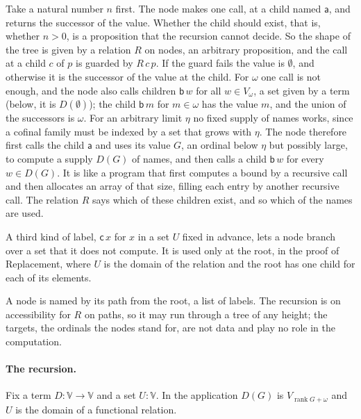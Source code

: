 \documentclass[10pt]{article}
\theoremstyle{definition}
\theoremstyle{remark}
\newcommand{\rk}{\operatorname{rank}}
\newcommand{\V}{\mathbb{V}}
\newcommand{\la}{\mathsf{a}}
\newcommand{\lb}{\mathsf{b}}
\newcommand{\lc}{\mathsf{c}}
\begin{document}
Take a natural number $n$ first. The node makes one call, at a child
named $\la$, and returns the successor of the value. Whether the child
should exist, that is, whether $n>0$, is a proposition that the
recursion cannot decide. So the shape of the tree is given by a relation
$R$ on nodes, an arbitrary proposition, and the call at a child $c$ of $p$
is guarded by $R\,c\,p$. If the guard fails the value is $\emptyset$, and
otherwise it is the successor of the value at the child. For $\omega$ one
call is not enough, and the node also calls children $\lb\,w$ for all
$w\in V_\omega$, a set given by a term (below, it is $D(\emptyset)$); the child $\lb\,m$ for $m\in\omega$ has the
value $m$, and the union of the successors is $\omega$. For an arbitrary
limit $\eta$ no fixed supply of names works, since a cofinal family must
be indexed by a set that grows with $\eta$. The node therefore first calls
the child $\la$ and uses its value $G$, an ordinal below $\eta$ but possibly
large, to compute a supply $D(G)$ of names, and then calls a child $\lb\,w$
for every $w\in D(G)$. It is like a program that first computes a bound
by a recursive call and then allocates an array of that size, filling
each entry by another recursive call. The relation $R$ says which of
these children exist, and so which of the names are used.

A third kind of label, $\lc\,x$ for $x$ in a set $U$ fixed in advance, lets
a node branch over a set that it does not compute. It is used only at
the root, in the proof of Replacement, where $U$ is the domain of the
relation and the root has one child for each of its elements.

A node is named by its path from the root, a list of labels. The
recursion is on accessibility for $R$ on paths, so it may run through a
tree of any height; the targets, the ordinals the nodes stand for, are
not data and play no role in the computation.

\paragraph{The recursion.}
Fix a term $D:\V\to\V$ and a set $U:\V$. In the application $D(G)$
is $V_{\rk G+\omega}$ and $U$ is the domain of a functional relation.
\end{document}
